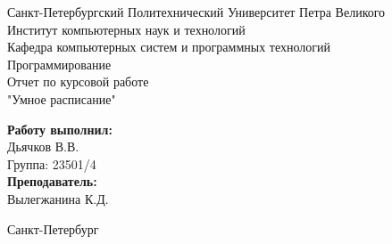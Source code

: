 \begin{titlepage}
	\begin{center}
		\large Санкт-Петербургский Политехнический Университет Петра Великого\\
		\large Институт компьютерных наук и технологий \\
		\large Кафедра компьютерных систем и программных технологий\\[6cm]
		\huge Программирование\\[0.5cm]
		\large Отчет по курсовой работе\\[0.1cm]
		\large "Умное расписание"\\[5cm]
	\end{center}

	\begin{flushright}
		\begin{minipage}{0.25\textwidth}
			\begin{flushleft}
				\large\textbf{Работу выполнил:}\\
				\large Дьячков В.В.\\
				\large {Группа:} 23501/4\\
				\large \textbf{Преподаватель:}\\
				\large Вылегжанина К.Д.
			\end{flushleft}
		\end{minipage}
	\end{flushright}
	\vfill
	\begin{center}
	\large Санкт-Петербург\\
	\large \the\year
	\end{center}

\thispagestyle{empty}
\end{titlepage}

\vfill